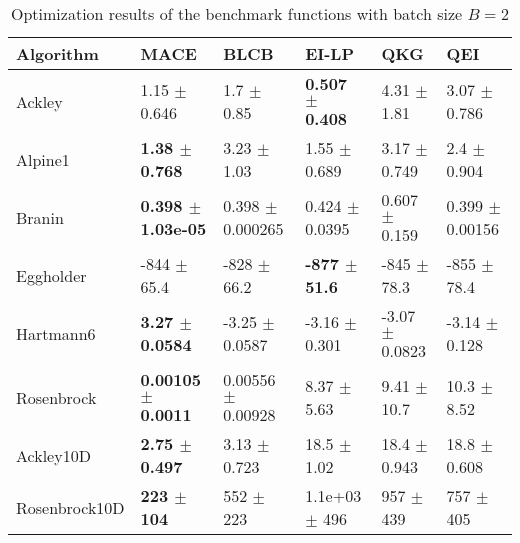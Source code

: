 \documentclass{article}
\begin{document}
\begin{table*}[!htb]
    \centering
    \caption{Optimization results of the benchmark functions with batch size $B=2$}
    \label{tab:result_analytical_b2}
    \begin{tabular}{llllll}
        \toprule
        Algorithm     & MACE                          & BLCB                       & EI-LP                        & QKG                    & QEI                              \\ \midrule
        Ackley        & 1.15            $\pm$  0.646     &  1.7      $\pm$  0.85      &  \textbf{0.507    $\pm$  0.408}   &  4.31   $\pm$  1.81    &  3.07   $\pm$  0.786     \\
        Alpine1       & \textbf{1.38    $\pm$  0.768}    &  3.23     $\pm$  1.03      &  1.55     $\pm$  0.689       &  3.17   $\pm$  0.749   &  2.4    $\pm$  0.904     \\
        Branin        & \textbf{0.398   $\pm$  1.03e-05} &  0.398    $\pm$  0.000265  &  0.424    $\pm$  0.0395      &  0.607  $\pm$  0.159   &  0.399  $\pm$  0.00156   \\
        Eggholder     & -844            $\pm$  65.4      &  -828     $\pm$  66.2      &  \textbf{-877     $\pm$  51.6}    &  -845   $\pm$  78.3    &  -855   $\pm$  78.4      \\
        Hartmann6     & \textbf{3.27    $\pm$  0.0584}   &  -3.25    $\pm$  0.0587    &  -3.16    $\pm$  0.301       &  -3.07  $\pm$  0.0823  &  -3.14  $\pm$  0.128     \\
        Rosenbrock    & \textbf{0.00105 $\pm$  0.0011}   &  0.00556  $\pm$  0.00928   &  8.37     $\pm$  5.63        &  9.41   $\pm$  10.7    &  10.3   $\pm$  8.52      \\
        Ackley10D     & \textbf{2.75    $\pm$  0.497}    &  3.13     $\pm$  0.723     &  18.5     $\pm$  1.02        &  18.4   $\pm$  0.943   &  18.8   $\pm$  0.608     \\
        Rosenbrock10D & \textbf{223     $\pm$  104}      &  552      $\pm$  223       &  1.1e+03  $\pm$  496         &  957    $\pm$  439     &  757    $\pm$  405       \\
        \bottomrule
    \end{tabular}
\end{table*}
\end{document}
